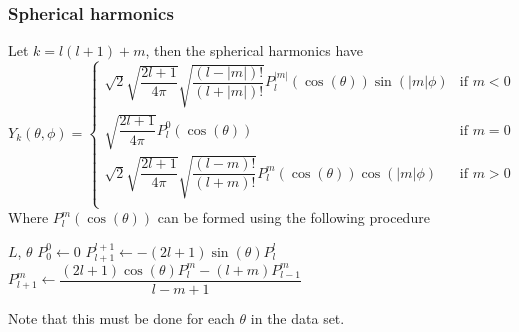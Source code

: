 \documentclass[12pt,a4paper]{article}
\begin{document}
\subsubsection{Spherical harmonics}
Let $k = l (l+1) + m$, then the spherical harmonics have
\[
    Y_k(\theta, \phi) = 
    \begin{cases}
        \sqrt{2} \sqrt{\dfrac{2l+1}{4 \pi}} \sqrt{\dfrac{(l-|m|)!}{(l+|m|)!}} P^{|m|}_l \left(\cos(\theta)\right) \sin(|m|\phi) & \text{if } m < 0\\
        \sqrt{\dfrac{2l+1}{4 \pi}} P^{0}_l \left(\cos(\theta)\right) & \text{if } m = 0\\
        \sqrt{2} \sqrt{\dfrac{2l+1}{4 \pi}} \sqrt{\dfrac{(l-m)!}{(l+m)!}} P^{m}_l \left(\cos(\theta)\right) \cos(|m|\phi) & \text{if } m > 0\\
    \end{cases}
\]
Where $P^m_l \left(\cos(\theta) \right)$ can be formed using the following procedure
\begin{algorithmic}
    \Require $L$, $\theta$
    \State $P_0^0 \gets 0$
        \State $P_{l+1}^{l+1} \gets -(2l+1)\sin(\theta)P_l^l$
        \\
            $P_{l+1}^m \gets \dfrac{(2l+1)\cos(\theta)P_l^m - (l+m)P_{l-1}^m}{l-m+1}$
        \EndFor
    \EndFor
\end{algorithmic}
Note that this must be done for each $\theta$ in the data set.
\end{document}
